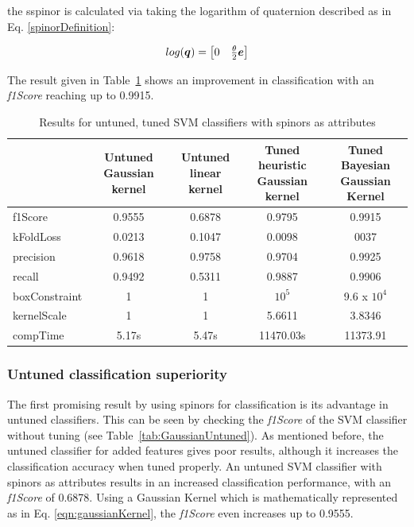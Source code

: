 the sspinor is calculated via taking the logarithm of quaternion described as in Eq. \ref{spinorDefinition}:

\begin{equation}{\label{spinorDefinition}}
log(\bm{q}) = \begin{bmatrix} 
0 & \frac{\theta}{2} \bm{e} \\
\end{bmatrix}
\end{equation}

The result given in Table~\ref{tab:spinorsGaussian} shows an improvement in classification with an \emph{f1Score} reaching up to 0.9915.

\begin{table}[hbt!]
\caption{\label{tab:spinorsGaussian} Results for untuned, tuned SVM classifiers with spinors as attributes}
\centering
\begin{tabular}{lcccc}
\hline
& \makecell{Untuned \\ Gaussian kernel} & \makecell{Untuned \\ linear kernel} & \makecell{Tuned heuristic \\ Gaussian kernel}& \makecell{Tuned Bayesian \\ Gaussian Kernel}\\\hline
f1Score& 0.9555 & 0.6878 & 0.9795 & 0.9915\\
kFoldLoss & 0.0213 & 0.1047 & 0.0098 & 0037 \\
precision& 0.9618 & 0.9758 & 0.9704 & 0.9925\\
recall& 0.9492 & 0.5311 & 0.9887 & 0.9906\\
boxConstraint& 1 & 1 & $10^{5}$ & 9.6 x $10^{4}$ \\
kernelScale& 1 & 1 & 5.6611 & 3.8346 \\
compTime & 5.17s& 5.47s &11470.03s& 11373.91\\
\hline
\end{tabular}
\end{table}

\subsubsection{Untuned classification superiority}

The first promising result by using spinors for classification is its advantage in untuned classifiers. This can be seen by checking the \emph{f1Score} of the SVM classifier without tuning (see Table~\ref{tab:GaussianUntuned}). As mentioned before, the untuned classifier for added features gives poor results, although it increases the classification accuracy when tuned properly. An untuned SVM classifier with spinors as attributes results in an increased classification performance, with an \emph{f1Score} of 0.6878. Using a Gaussian Kernel which is mathematically represented as in Eq. \ref{eqn:gaussianKernel}, the \emph{f1Score} even increases up to 0.9555.

